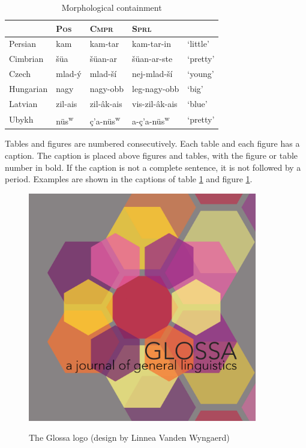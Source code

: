 \documentclass[charis,linguex,biblatex]{glossa}
\begin{document}
\begin{table}[h]
\sffamily
\centering
\caption{Morphological containment}	
\begin{tabular}{lllll}
 & \textsc{Pos} & \textsc{Cmpr} & \textsc{Sprl}\\
\hline 
Persian & kam & kam-tar & kam-tar-in & ‘little’\\
Cimbrian & šüa & šüan-ar & šüan-ar-ste & ‘pretty’ \\
Czech & mlad-ý & mlad-ší & nej-mlad-ší & ‘young’\\
Hungarian & nagy & nagy-obb & leg-nagy-obb & ‘big’\\
Latvian & zil-ais & zil-âk-ais & vis-zil-âk-ais & ‘blue’\\
Ubykh &  nüs\textsuperscript{w}\textipa{@} & ç’a-nüs\textsuperscript{w}\textipa{@} & a-ç’a-nüs\textsuperscript{w}\textipa{@} & ‘pretty’ \\
\end{tabular}\label{tbl:table1}
\end{table}

Tables and figures are numbered consecutively. Each table and each figure has a caption. The caption is placed above figures and tables, with the figure or table number in bold.  If the caption is not a complete sentence, it is not followed by a period. Examples are shown in the captions of table \ref{tbl:table1} and figure \ref{fig:glossalogo}. 

\begin{figure}[h]
\centering
\caption{The Glossa logo (design by Linnea Vanden Wyngaerd)}
\includegraphics[width=10cm]{glossa}
\label{fig:glossalogo}
\end{figure}
\end{document}
